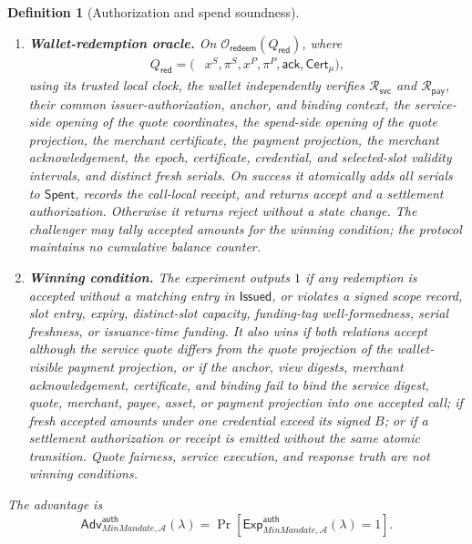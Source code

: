 \documentclass[letterpaper]{article}
\newcommand{\system}{MinMandate\xspace}
\newcommand{\adv}{\mathcal{A}}
\newtheorem{definition}{Definition}
\begin{document}
\begin{definition}[Authorization and spend soundness]
\begin{enumerate}
  and validity intervals using its trusted local clock.
  \item \textbf{Wallet-redemption oracle.} On
  \(\mathcal O_{\mathsf{redeem}}(Q_{\mathsf{red}})\), where
  \begin{equation}
  \begin{aligned}
  Q_{\mathsf{red}}=(&x^S,\pi^S,x^P,\pi^P,\mathsf{ack},\mathsf{Cert}_{\mu}),
  \end{aligned}
  \label{eq:redemption-query}
  \end{equation}
  using its trusted local clock, the wallet independently verifies
  \(\mathcal R_{\mathsf{svc}}\) and
  \(\mathcal R_{\mathsf{pay}}\), their common issuer-authorization, anchor,
  and binding context, the service-side opening of the quote coordinates, the
  spend-side opening of the quote projection, the merchant certificate, the
  payment projection, the merchant acknowledgement, the epoch, certificate,
  credential, and selected-slot validity intervals, and distinct fresh
  serials. On success it atomically adds
  all serials to \(\mathsf{Spent}\), records the call-local receipt, and returns
  accept and a settlement authorization. Otherwise it returns reject without a
  state change. The challenger may tally accepted amounts for the winning
  condition; the protocol maintains no cumulative balance counter.
  \item \textbf{Winning condition.} The experiment outputs \(1\) if any
  redemption is accepted without a matching entry in \(\mathsf{Issued}\), or
  violates a signed scope record, slot entry, expiry, distinct-slot capacity,
  funding-tag well-formedness, serial freshness, or issuance-time funding. It
  also wins if both relations accept although the service quote differs from
  the quote projection of the wallet-visible payment projection, or if the
  anchor, view digests, merchant acknowledgement, certificate, and binding fail
  to bind the service digest, quote, merchant, payee, asset, or payment
  projection into one accepted
  call; if fresh
  accepted amounts under one credential exceed its signed \(B\); or if a
  settlement authorization or receipt is emitted without the same atomic
  transition. Quote fairness, service execution, and response truth are not
  winning conditions.
\end{enumerate}
The advantage is
\begin{equation}
  \mathsf{Adv}^{\mathsf{auth}}_{\system,\adv}(\lambda)
  =
  \Pr[\mathsf{Exp}^{\mathsf{auth}}_{\system,\adv}(\lambda)=1].
\label{eq:auth-adv}
\end{equation}
\end{definition}
\end{document}
